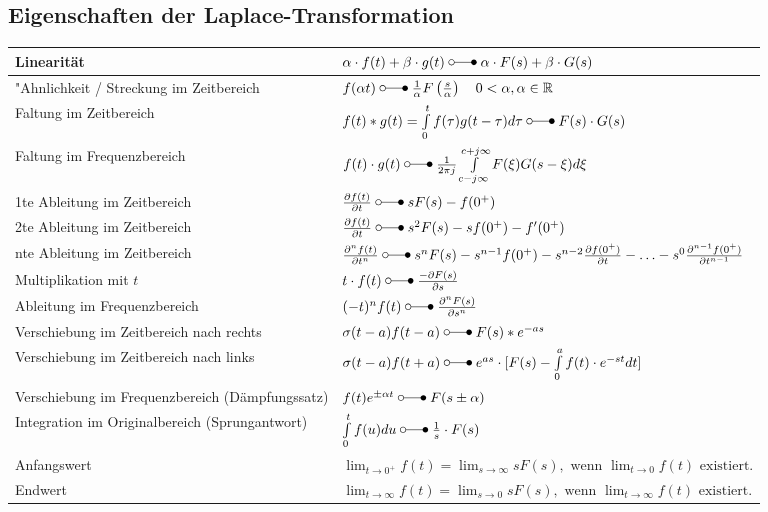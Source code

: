  	\subsection{Eigenschaften der Laplace-Transformation}
  		\renewcommand{\arraystretch}{2}
		\begin{tabular}{|l|l|}
        	\hline
        	Linearität & 
 			$\alpha\cdot f(t) + \beta\cdot g(t) \; \laplace \; \alpha\cdot F(s) + \beta\cdot
 			G(s)$ \\
 			\hline
 			"Ahnlichkeit / Streckung im Zeitbereich &
 			$f(\alpha t) \; \laplace \; \frac{1}{\alpha}F \left (\frac{s}{\alpha} \right ) \quad 0 <\alpha, \alpha \in\mathbb{R}$ \\
 			\hline
 			Faltung im Zeitbereich &
 			$f(t) \ast g(t) = \int\limits_{0}^{t} f(\tau)g(t-\tau)d\tau \; \laplace \; F(s)
 			\cdot G(s)$\\
 			\hline
 			Faltung im Frequenzbereich &
 			$f(t) \cdot g(t) \; \laplace \; \frac{1}{2\pi j}\int\limits_{c-j\infty}^{c+j\infty}
 			F(\xi) G(s-\xi)d\xi$ \\
 			\hline
 			1te Ableitung im Zeitbereich &
 			$\frac{\partial f(t)}{\partial t} \; \laplace \; sF(s)
 			-f(0^+)$ \\
 			\hline
 			2te Ableitung im Zeitbereich &
 			$\frac{\partial f(t)}{\partial t} \; \laplace \; s^2F(s)
 			-sf(0^+) -f'(0^+)$ \\
 			\hline
 			nte Ableitung im Zeitbereich &
 			$\frac{\partial^n f(t)}{\partial t^n} \; \laplace \; s^nF(s)
 			-s^{n-1}f(0^+)-s^{n-2}\frac{\partial f(0^+)}{\partial t}-\ldots
 			-s^0\frac{\partial^{n-1} f(0^+)}{\partial t^{n-1}}$ \\
 			\hline
 			Multiplikation mit $t$ &
 			$t\cdot f(t)  \; \laplace \; \frac{-\partial F(s)}{\partial s}$ \\
 			\hline
 			Ableitung im Frequenzbereich &
 			$(-t)^n f(t) \; \laplace \;  \frac{\partial^n F(s)}{\partial s^n}$ \\
 			\hline
 			Verschiebung im Zeitbereich nach rechts &
 			$\sigma(t-a)f(t - a) \; \laplace \; F(s)*e^{-as}$ \\
 			\hline
			Verschiebung im Zeitbereich nach links &
			$\sigma(t-a)f(t + a) \; \laplace \; e^{as} \cdot [F(s) - \int\limits_0^{a} f(t) \cdot e^{-st} dt]$\\
			\hline
 			Verschiebung im Frequenzbereich (Dämpfungssatz) &
 			$f(t)e^{\pm\alpha t} \; \laplace \; F(s\pm\alpha)$ \\
 			\hline
 			Integration im Originalbereich (Sprungantwort)&
 			$\int\limits_0^t f(u)du \; \laplace \; \frac{1}{s}\cdot F(s)$ \\
 			\hline
 			Anfangswert &
 			$\lim_{t\rightarrow 0^+} f(t) = \lim_{s\rightarrow \infty} sF(s),\text{~wenn
 			}  \lim_{t\rightarrow 0} f(t)\text{~existiert}.$ \\
 			\hline
 			Endwert &
 			$\lim_{t\rightarrow \infty} f(t) = \lim_{s\rightarrow 0} sF(s),\text{~wenn
 			}  \lim_{t\rightarrow \infty} f(t)\text{~existiert}.$ \\
 			\hline
       	\end{tabular}
		\renewcommand{\arraystretch}{\arraystretchOriginal}
	
